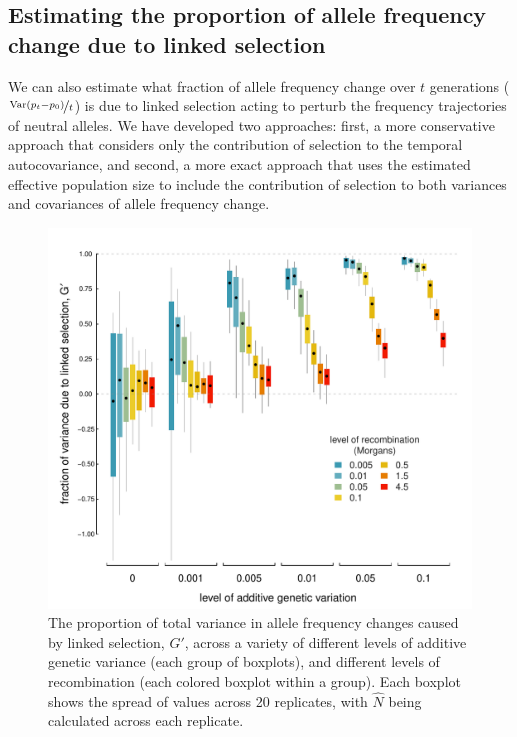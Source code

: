 \documentclass[11pt]{article}
\DeclareMathOperator{\var}{Var}
\begin{document}
\subsection{Estimating the proportion of allele frequency change due to linked selection}

We can also estimate what fraction of allele frequency change over $t$
generations ($\nicefrac{\var(p_t - p_0)}{t}$) is due to linked selection acting
to perturb the frequency trajectories of neutral alleles. We have developed two
approaches: first, a more conservative approach that considers only the
contribution of selection to the temporal autocovariance, and second, a more
exact approach that uses the estimated effective population size to include the
contribution of selection to both variances and covariances of allele frequency
change.

\begin{figure}
  \centering
  \includegraphics{./images/estimate-gp.pdf} 

  \caption{The proportion of total variance in allele frequency changes caused
    by linked selection, $G'$, across a variety of different levels of additive
    genetic variance (each group of boxplots), and different levels of
    recombination (each colored boxplot within a group). Each boxplot shows the
  spread of values across 20 replicates, with $\widehat{N}$ being calculated
across each replicate.} 

  \label{fig:est-g}
\end{figure}
\end{document}
